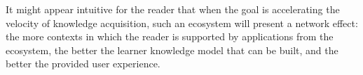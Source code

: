 It might appear intuitive for the reader that when the goal is accelerating the velocity of knowledge acquisition, such an ecosystem will present a network effect: the more contexts in which the reader is supported by applications from the ecosystem, the better the learner knowledge model that can be built, and the better the provided user experience.




	


